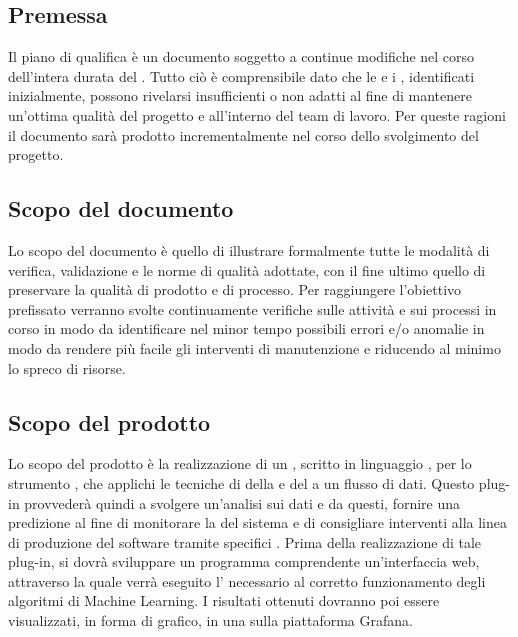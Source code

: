 \documentclass[../piano-di-qualifica.tex]{subfiles}
\begin{document}
\subsection{Premessa}%
\label{sub:premessa}
Il piano di qualifica è un documento soggetto a continue modifiche nel corso dell'intera durata del .
Tutto ciò è comprensibile dato che le  e i , identificati inizialmente, possono rivelarsi insufficienti o non adatti al fine di mantenere un'ottima qualità del progetto e all'interno del team di lavoro.
Per queste ragioni il documento sarà prodotto incrementalmente nel corso dello svolgimento del progetto.

\subsection{Scopo del documento}%
\label{sub:scopo_del_documento}
Lo scopo del documento è quello di illustrare formalmente tutte le modalità di verifica, validazione e le norme di qualità adottate, con il fine ultimo quello di preservare la qualità di prodotto e di processo.
Per raggiungere l'obiettivo prefissato verranno svolte continuamente verifiche sulle attività e sui processi in corso in modo da identificare nel minor tempo possibili errori e/o anomalie in modo da rendere più facile gli interventi di manutenzione e riducendo al minimo lo spreco di risorse.

\subsection{Scopo del prodotto}%
\label{sub:scopo_del_prodotto}
Lo scopo del prodotto è la realizzazione di un , scritto in linguaggio , per lo strumento  ,
che applichi le tecniche di  della  e del  a un flusso di dati.
Questo plug-in provvederà quindi a svolgere un'analisi sui dati e da questi, fornire una predizione al fine di monitorare la  del sistema e di consigliare 
interventi alla linea di produzione del software tramite specifici .
Prima della realizzazione di tale plug-in, si dovrà sviluppare un programma comprendente un'interfaccia web, attraverso la quale verrà eseguito l' necessario al corretto
funzionamento degli algoritmi di Machine Learning.
I risultati ottenuti dovranno poi essere visualizzati, in forma di grafico, in una  sulla piattaforma Grafana.
\end{document}

